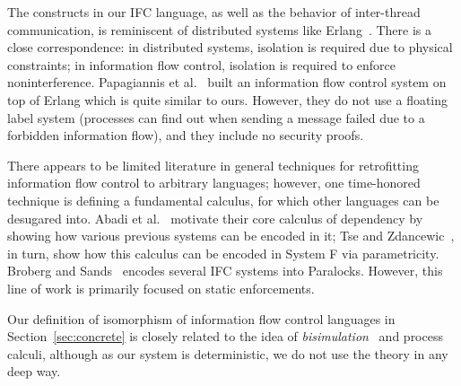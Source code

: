 \documentclass{sigplanconf}
\newcommand{\Red}[1]{{\color{red} #1}}
\newcommand{\todo}[2]{\Red{\textbf{TODO[}#1\textbf{]:} #2}} %
\begin{document}


The constructs in our IFC language, as well as the behavior of
inter-thread communication, is reminiscent of distributed systems
like Erlang~\cite{Armstrong03makingreliable}.  There is a close
correspondence: in distributed systems, isolation is required due to
physical constraints; in information flow control, isolation is
required to enforce noninterference.  Papagiannis et al.~\cite{Papagiannis_enforcinguser}
built an information flow control system on top of Erlang which is quite
similar to ours.  However, they do not use a floating label system (processes
can find out when sending a message failed due to a forbidden information flow),
and they include no security proofs.

There appears to be limited literature in general techniques for retrofitting
information flow control to arbitrary languages; however, one time-honored
technique is defining a fundamental calculus, for which other languages can be
desugared into.  Abadi et al.~\cite{abadi+:core} motivate their core calculus of
dependency by showing how various previous systems can be encoded in it; Tse and
Zdancewic~\cite{Tse:Zdancewic:ICFP04}, in turn, show how this calculus can be
encoded in System F via parametricity.  Broberg and Sands~\cite{Broberg:2010}
encodes several IFC systems into Paralocks.  However, this line of work is
primarily focused on static enforcements. 

Our definition of isomorphism of information flow control languages in
Section~\ref{sec:concrete} is closely related to the idea of
\emph{bisimulation}~\cite{Milner:1989:CC:534666} and process calculi,
although as our system is deterministic, we do not use the theory in any
deep way.
\end{document}
